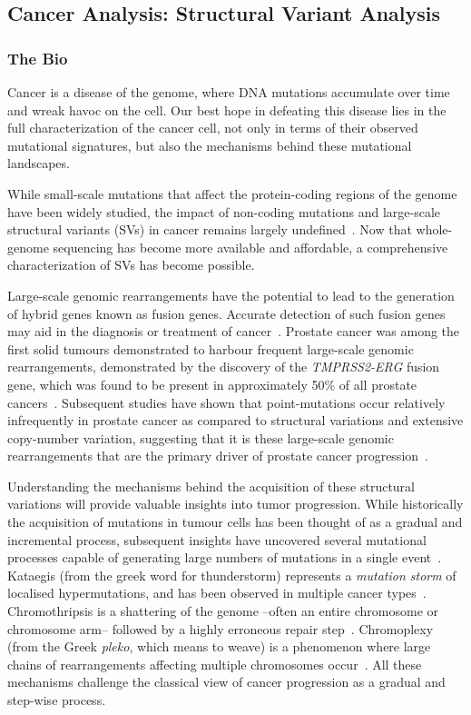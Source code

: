 \subsection{Cancer Analysis: Structural Variant Analysis}
\subsubsection{The Bio}

Cancer is a disease of the genome, where DNA mutations accumulate over time and wreak havoc on the cell. Our best hope in defeating this disease lies in the full characterization of the cancer cell, not only in terms of their observed mutational signatures, but also the mechanisms behind these mutational landscapes.

While small-scale mutations that affect the protein-coding regions of the genome have been widely studied, the impact of non-coding mutations and large-scale structural variants (SVs) in cancer remains largely undefined~\cite{cuykendall2017non,khurana2016role}. Now that whole-genome sequencing has become more available and affordable, a comprehensive characterization of SVs has become possible.

Large-scale genomic rearrangements have the potential to lead to the generation of hybrid genes known as fusion genes.
Accurate detection of such fusion genes may aid in the diagnosis or treatment of cancer~\cite{nowell1960chromosome,nowell1961chromosome,druker2001activity,druker2001efficacy}.
Prostate cancer was among the first solid tumours demonstrated to harbour frequent large-scale genomic rearrangements, demonstrated by the discovery of the \emph{TMPRSS2-ERG} fusion gene, which was found to be present in approximately 50\% of all prostate cancers~\cite{tomlins2005recurrent}.
Subsequent studies have shown that point-mutations occur relatively infrequently in prostate cancer as compared to structural variations and extensive copy-number variation, suggesting that it is these large-scale genomic rearrangements that are the primary driver of prostate cancer progression~\cite{taylor2010integrative,rubin2011common}.

Understanding the mechanisms behind the acquisition of these structural variations will provide valuable insights into tumor progression.
While historically the acquisition of mutations in tumour cells has been thought of as a gradual and incremental process, subsequent insights have uncovered several mutational processes capable of generating large numbers of mutations in a single event~\cite{cortes2020comprehensive,willis2015}.
Kataegis (from the greek word for thunderstorm) represents a \emph{mutation storm} of localised hypermutations, and has been observed in multiple cancer types~\cite{nik2012mutational,davis2014somatic}.
Chromothripsis is a shattering of the genome --often an entire chromosome or chromosome arm-- followed by a highly erroneous repair step~\cite{stephens2011massive,maher2012chromothripsis}.
Chromoplexy (from the Greek \emph{pleko}, which means to weave) is a phenomenon where large chains of rearrangements affecting multiple chromosomes occur~\cite{shen2013chromoplexy}. All these mechanisms challenge the classical view of cancer progression as a gradual and step-wise process.

